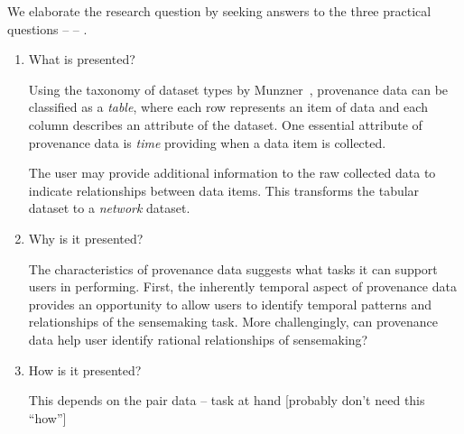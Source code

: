 %

We elaborate the research question by seeking answers to the three practical questions  --  -- . 


\begin{enumerate}
	\item What is presented?
	
	Using the taxonomy of dataset types by Munzner~\cite{Munzner2014}, provenance data can be classified as a \emph{table}, where each row represents an item of data and each column describes an attribute of the dataset. One essential attribute of provenance data is \emph{time} providing when a data item is collected.
	
	The user may provide additional information to the raw collected data to indicate relationships between data items. This transforms the tabular dataset to a \emph{network} dataset.
	
	\item Why is it presented?
	
	The characteristics of provenance data suggests what tasks it can support users in performing. First, the inherently temporal aspect of provenance data provides an opportunity to allow users to identify temporal patterns and relationships of the sensemaking task. More challengingly, can provenance data help user identify rational relationships of sensemaking?
	
	\item How is it presented?
	
	This depends on the pair data -- task at hand [probably don't need this ``how'']
\end{enumerate}


